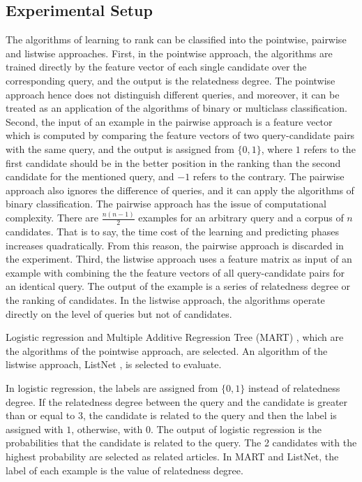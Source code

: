 \subsection{Experimental Setup}
\label{sec:6.3}

The algorithms of learning to rank can be classified into the pointwise, pairwise and listwise approaches. First, in the pointwise approach, the algorithms are trained directly by the feature vector of each single candidate over the corresponding query, and the output is the relatedness degree. The pointwise approach hence does not distinguish different queries, and moreover, it can be treated as an application of the algorithms of binary or multiclass classification. Second, the input of an example in the pairwise approach is a feature vector which is computed by comparing the feature vectors of two query-candidate pairs with the same query, and the output is assigned from $\{0, 1\}$, where $1$ refers to the first candidate should be in the better position in the ranking than the second candidate for the mentioned query, and $-1$ refers to the contrary. The pairwise approach also ignores the difference of queries, and it can apply the algorithms of binary classification. The pairwise approach has the issue of computational complexity. There are $\frac{n(n-1)}{2}$ examples for an arbitrary query and a corpus of $n$ candidates. That is to say, the time cost of the learning and predicting phases increases quadratically. From this reason, the pairwise approach is discarded in the experiment. Third, the listwise approach uses a feature matrix as input of an example with combining the the feature vectors of all query-candidate pairs for an identical query. The output of the example is a series of relatedness degree or the ranking of candidates. In the listwise approach, the algorithms operate directly on the level of queries but not of candidates. 

Logistic regression and Multiple Additive Regression Tree (MART) \citep{friedman2002stochastic}, which are the algorithms of the pointwise approach, are selected. An algorithm of the listwise approach, ListNet \citep{cao2007learning}, is selected to evaluate. 

In logistic regression, the labels are assigned from $\{0, 1\}$ instead of relatedness degree. If the relatedness degree between the query and the candidate is greater than or equal to $3$, the candidate is related to the query and then the label is assigned with $1$, otherwise, with $0$. The output of logistic regression is the probabilities that the candidate is related to the query. The 2 candidates with the highest probability are selected as related articles. In MART and ListNet, the label of each example is the value of relatedness degree. 

